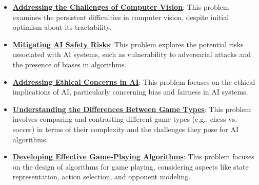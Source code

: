\documentclass{article}%
\begin{document}
\begin{itemize}[leftmargin=*]
\item \href{https://purdue.brightspace.com/d2l/common/assets/pdfjs-d2l-dist/1.0.14-legacy/web/viewer.html?file=\%2Fcontent\%2Fenforced\%2F1095467-wl.202510.CS.24300.001\%2F02L2-Intro.pdf\%3Fou\%3D1095467\&lang=en-us\&container=d2l-fileviewer-rendered-pdf\&fullscreen=d2l-fileviewer-rendered-pdf-dialog\&height=667#page=15}{\textbf{Addressing the Challenges of Computer Vision}}: This problem examines the persistent difficulties in computer vision, despite initial optimism about its tractability.%
\item \href{https://purdue.brightspace.com/d2l/common/assets/pdfjs-d2l-dist/1.0.14-legacy/web/viewer.html?file=\%2Fcontent\%2Fenforced\%2F1095467-wl.202510.CS.24300.001\%2F02L2-Intro.pdf\%3Fou\%3D1095467\&lang=en-us\&container=d2l-fileviewer-rendered-pdf\&fullscreen=d2l-fileviewer-rendered-pdf-dialog\&height=667#page=19}{\textbf{Mitigating AI Safety Risks}}: This problem explores the potential risks associated with AI systems, such as vulnerability to adversarial attacks and the presence of biases in algorithms.%
\item \href{https://purdue.brightspace.com/d2l/common/assets/pdfjs-d2l-dist/1.0.14-legacy/web/viewer.html?file=\%2Fcontent\%2Fenforced\%2F1095467-wl.202510.CS.24300.001\%2F02L2-Intro.pdf\%3Fou\%3D1095467\&lang=en-us\&container=d2l-fileviewer-rendered-pdf\&fullscreen=d2l-fileviewer-rendered-pdf-dialog\&height=667#page=20}{\textbf{Addressing Ethical Concerns in AI}}: This problem focuses on the ethical implications of AI, particularly concerning bias and fairness in AI systems.%
\item \href{https://purdue.brightspace.com/d2l/common/assets/pdfjs-d2l-dist/1.0.14-legacy/web/viewer.html?file=\%2Fcontent\%2Fenforced\%2F1095467-wl.202510.CS.24300.001\%2F02L2-Intro.pdf\%3Fou\%3D1095467\&lang=en-us\&container=d2l-fileviewer-rendered-pdf\&fullscreen=d2l-fileviewer-rendered-pdf-dialog\&height=667#page=27}{\textbf{Understanding the Differences Between Game Types}}: This problem involves comparing and contrasting different game types (e.g., chess vs. soccer) in terms of their complexity and the challenges they pose for AI algorithms.%
\item \href{https://purdue.brightspace.com/d2l/common/assets/pdfjs-d2l-dist/1.0.14-legacy/web/viewer.html?file=\%2Fcontent\%2Fenforced\%2F1095467-wl.202510.CS.24300.001\%2F02L2-Intro.pdf\%3Fou\%3D1095467\&lang=en-us\&container=d2l-fileviewer-rendered-pdf\&fullscreen=d2l-fileviewer-rendered-pdf-dialog\&height=667#page=24}{\textbf{Developing Effective Game{-}Playing Algorithms}}: This problem focuses on the design of algorithms for game playing, considering aspects like state representation, action selection, and opponent modeling.%

\end{itemize}
\end{document}
